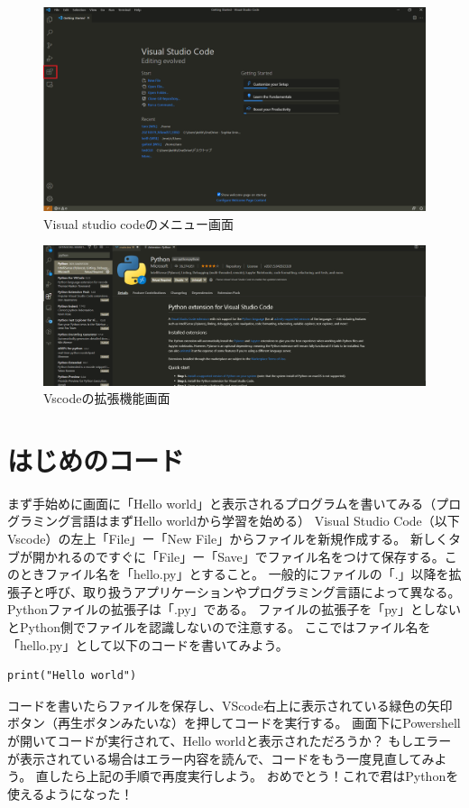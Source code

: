 \documentclass[]{ltjsarticle}
\begin{document}
	\begin{figure}
		\centering
		\includegraphics[width=0.9\linewidth]{figs/vscode1.png}
		\caption{Visual studio codeのメニュー画面}
		\label{fig:1}
	\end{figure}

	\begin{figure}
		\centering
		\includegraphics[width=0.9\linewidth]{figs/vscode2.png}
		\caption{Vscodeの拡張機能画面}
		\label{fig:vscode-extension}
	\end{figure}

	\section{はじめのコード}
	まず手始めに画面に「Hello world」と表示されるプログラムを書いてみる（プログラミング言語はまずHello worldから学習を始める）
	Visual Studio Code（以下Vscode）の左上「File」ー「New File」からファイルを新規作成する。
	新しくタブが開かれるのですぐに「File」ー「Save」でファイル名をつけて保存する。このときファイル名を「hello.py」とすること。
	一般的にファイルの「.」以降を拡張子と呼び、取り扱うアプリケーションやプログラミング言語によって異なる。
	Pythonファイルの拡張子は「.py」である。
	ファイルの拡張子を「py」としないとPython側でファイルを認識しないので注意する。
	ここではファイル名を「hello.py」として以下のコードを書いてみよう。

	\begin{lstlisting}[caption=hello.py,label=fuga]
		print("Hello world")
	\end{lstlisting}
	コードを書いたらファイルを保存し、VScode右上に表示されている緑色の矢印ボタン（再生ボタンみたいな）を押してコードを実行する。
	画面下にPowershellが開いてコードが実行されて、Hello worldと表示されただろうか？
	もしエラーが表示されている場合はエラー内容を読んで、コードをもう一度見直してみよう。
	直したら上記の手順で再度実行しよう。
	おめでとう！これで君はPythonを使えるようになった！
\end{document}
